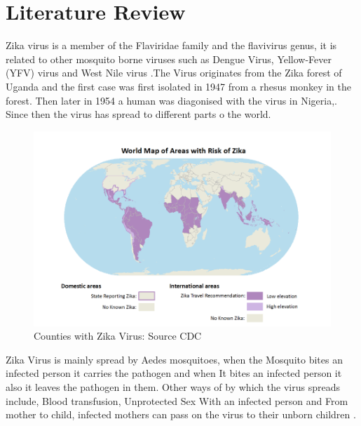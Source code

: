 \chapter{Literature Review}

Zika virus is a member of the Flaviridae family
and the flavivirus genus, it is related to other mosquito borne viruses such as Dengue Virus, Yellow-Fever (YFV) virus  and West Nile virus \citep{doi}.The Virus originates from the Zika forest of Uganda and the first case was first isolated in 1947 from a rhesus monkey in the forest. Then later in 1954 a human was diagonised with the virus in Nigeria,\citep{2015zika}. Since then the virus has spread to different parts o the world.



\begin{figure}[h!]
\centering
\includegraphics[scale=0.5]{images/map_zika.png} 
\caption{Counties with Zika Virus: Source CDC}\label{fig 1}
\end{figure}



Zika Virus is mainly spread by Aedes mosquitoes, when the Mosquito bites an infected person it carries the pathogen and when It bites an infected person it also it leaves the pathogen in them. 
Other ways of by which the virus spreads include, Blood transfusion, Unprotected Sex With an infected person and From mother to child, infected mothers can pass on the virus to their unborn children \citep{musso2014}.
 

